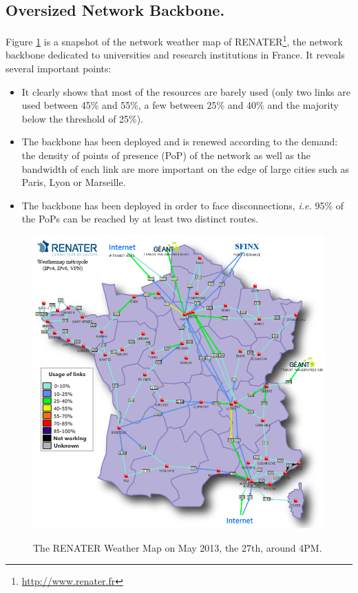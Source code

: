 \subsection{Oversized Network Backbone.}
Figure \ref{fig:renater} is a snapshot of the network weather
map of RENATER\footnote{\href{http://www.renater.fr}{http://www.renater.fr}}, the network backbone dedicated to universities and research
institutions in France. It reveals several important points: 
\begin{itemize} 
\item It clearly shows that most of the resources are barely used (only two links are used between 45\% and 55\%, a few between 25\% and 40\% and the majority below the threshold of 25\%). 
\item The backbone has been deployed and is renewed according to the demand: the density of
points of presence (PoP) of the network as well as the bandwidth of each link are more important on the edge of large cities such as Paris, Lyon or
Marseille. 
\item The backbone has been deployed in order to face disconnections, \textit{i.e.} 95\% of the PoPs can be reached by at least two distinct routes.
\end{itemize}


\begin{figure}[b]
\includegraphics[width=12cm]{./FIGS/renater.png}
\vspace*{-.3cm}
\label{fig:renater}
\caption{The RENATER Weather Map on May 2013, the 27th, around 4PM.}
\vspace*{-.3cm}
\end{figure}

